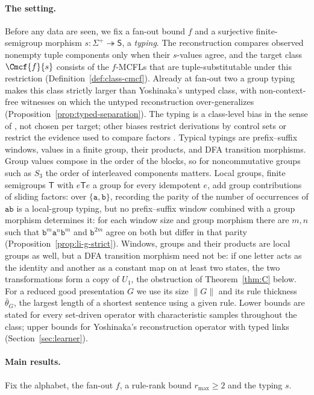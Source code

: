 \paragraph{The setting.}
Before any data are seen, we fix a fan-out bound $f$ and a surjective
finite-semigroup morphism $s:\Sigma^+\twoheadrightarrow\mathsf S$, a
\emph{typing}.  The reconstruction compares observed nonempty tuple components
only when their $s$-values agree, and the target class $\Cmcf{f}{s}$
consists of the $f$-MCFLs that are tuple-substitutable under this
restriction (Definition~\ref{def:class-cmcf}).  Already at fan-out two a
group typing makes this class strictly larger than Yoshinaka's untyped class,
with non-context-free witnesses on which the untyped reconstruction
over-generalizes (Proposition~\ref{prop:typed-separation}).  The typing is a
class-level bias in the sense of \cite{CosteTyping2004}, not chosen per
target; other biases restrict derivations by control sets
\cite{Takada1988,Takada1995} or restrict the evidence used to compare
factors \cite{CosteGaretNicolas2012,CosteNicolas2019}.  Typical typings are
prefix--suffix windows, values in a finite group, their products, and DFA
transition morphisms.  Group values compose in
the order of the blocks, so for noncommutative groups such as $S_3$ the order of
interleaved components matters.  Local groups, finite semigroups $\mathsf T$ with
$e\mathsf Te$ a group for every idempotent $e$, add group contributions of
sliding factors: over $\{\mathtt a,\mathtt b\}$, recording the parity of the
number of occurrences of $\mathtt{ab}$ is a local-group typing, but no
prefix--suffix window combined with a group morphism determines it: for each
window size and group morphism there are $m,n$ such that
$\mathtt b^m\mathtt a^{n}\mathtt b^m$ and $\mathtt b^{2m}$ agree on both but
differ in that parity
(Proposition~\ref{prop:li-g-strict}).  Windows, groups and their products are local
groups as well, but a DFA transition morphism need not be: if one letter acts as the
identity and another as a constant map on at least two states, the two transformations
form a copy of $U_1$, the obstruction of Theorem~\ref{thm:C} below.  For a reduced good presentation $G$ we
use its size $\|G\|$ and its rule thickness $\bar\theta_G$, the largest length
of a shortest sentence using a given rule.  Lower bounds are stated for every
set-driven operator with characteristic samples throughout the class; upper
bounds for Yoshinaka's reconstruction operator with typed links (Section~\ref{sec:learner}).

\paragraph{Main results.}
Fix the alphabet, the fan-out $f$, a rule-rank bound $r_{\max}\ge2$ and the
typing $s$.

